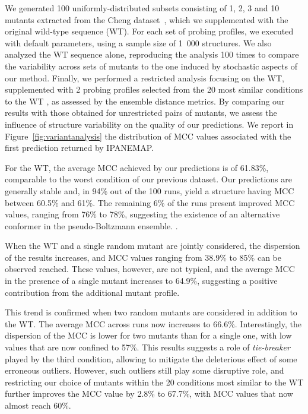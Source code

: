 \documentclass[a4,center,fleqn]{NAR}
\newcommand{\Software}[1]{\text{\ttfamily\bfseries #1}}
\newcommand{\OurTool}{\Software{IPANEMAP}\xspace}
\newcommand{\Draft}[1]{{#1}}
\newcommand{\as}[1]{\Draft{\todo[color=green!70!black]{\sf Afaf: #1}}}
\begin{document}
We generated 100 uniformly-distributed subsets consisting of 1, 2, 3 and 10 mutants extracted from the Cheng dataset~\cite{Cheng2017}, which we supplemented with the original wild-type sequence (WT).
For each set of probing profiles, we executed \OurTool{} with default parameters, using a sample size of 1~000 structures. 
We also analyzed the WT sequence alone, reproducing the analysis 100 times to compare the variability across sets of mutants to the one induced by stochastic aspects of our method. 
Finally, we performed a restricted analysis focusing on the WT, supplemented with 2 probing profiles selected from the 20 most similar conditions to the WT , as assessed by the ensemble distance metrics. By comparing our results with those obtained for unrestricted pairs of mutants, we assess the influence of structure variability on the quality of our predictions. We report in Figure~\ref{fig:variantanalysis} the distribution of MCC values associated with the first prediction returned by IPANEMAP.

For the WT, the average MCC achieved by our predictions is of 61.83\%, comparable to the worst condition of our previous dataset.
Our predictions are generally stable and, in 94\% out of the 100 runs, yield a structure having MCC between 60.5\% and 61\%. The remaining 6\% of the runs present improved MCC values, ranging from 76\% to 78\%, suggesting the existence of an alternative conformer in the pseudo-Boltzmann ensemble.
.%

When the WT and a single random mutant are jointly considered, the dispersion of the results increases, and MCC values ranging from 38.9\% to 85\% can be observed reached.%
These values, however, are not typical, and the average MCC in the presence of a single mutant increases to 64.9\%,%
suggesting a positive contribution from the additional mutant profile. 

This trend is confirmed when two random mutants are considered in addition to the WT. The average MCC across runs now increases to 66.6\%. %
Interestingly, the dispersion of the MCC is lower for two mutants than for a single one, with low values that are now confined to 57\%.  This results suggests  a role of \emph{tie-breaker} played by the third condition, allowing to mitigate the deleterious effect of some erroneous outliers.
However, such outliers still play some disruptive role, and restricting our choice of mutants within the 20 conditions most similar to the WT further improves the MCC value by 2.8\% to 67.7\%, with MCC values that now almost reach 60\%.  
\end{document}
